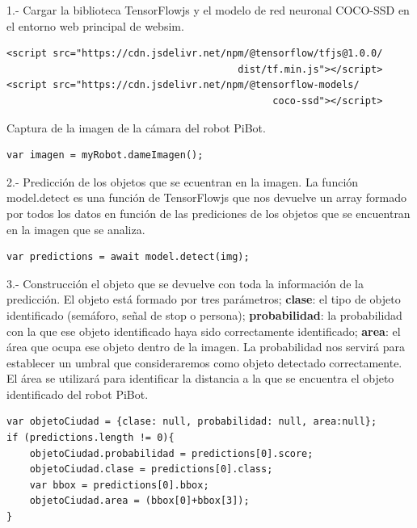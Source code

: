 \documentclass{report}
\begin{document}
1.- Cargar la biblioteca TensorFlowjs y el modelo de red neuronal COCO-SSD en el entorno web principal de websim.

\begin{lstlisting}[backgroundcolor = \color{light-gray},
				   aboveskip = 2em,
				   belowskip = 2em,
                   framexleftmargin = 1em,
                   basicstyle=\small]
<script src="https://cdn.jsdelivr.net/npm/@tensorflow/tfjs@1.0.0/
                                        dist/tf.min.js"></script>
<script src="https://cdn.jsdelivr.net/npm/@tensorflow-models/
                                              coco-ssd"></script>
\end{lstlisting}

Captura de la imagen de la cámara del robot PiBot.

\begin{lstlisting}[backgroundcolor = \color{light-gray},
				   aboveskip = 2em,
				   belowskip = 2em,
                   xleftmargin = 2cm,
                   framexleftmargin = 1em,
                   basicstyle=\small]
var imagen = myRobot.dameImagen();
\end{lstlisting}

2.- Predicción de los objetos que se ecuentran en la imagen. La función model.detect es una función de TensorFlowjs que nos devuelve un array formado por todos los datos en función de las prediciones de los objetos que se encuentran en la imagen que se analiza.

\begin{lstlisting}[backgroundcolor = \color{light-gray},
				   aboveskip = 2em,
				   belowskip = 2em,
                   xleftmargin = 2cm,
                   framexleftmargin = 1em,
                   basicstyle=\small]
var predictions = await model.detect(img);
\end{lstlisting}

3.- Construcción el objeto que se devuelve con toda la información de la predicción. El objeto está formado por tres parámetros; \textbf{clase}: el tipo de objeto identificado (semáforo, señal de stop o persona); \textbf{probabilidad}: la probabilidad con la que ese objeto identificado haya sido correctamente identificado; \textbf{area}: el área que ocupa ese objeto dentro de la imagen. La probabilidad nos servirá para establecer un umbral que consideraremos como objeto detectado correctamente. El área se utilizará para identificar la distancia a la que se encuentra el objeto identificado del robot PiBot.


\begin{lstlisting}[backgroundcolor = \color{light-gray},
				   belowskip = 2em,
                   xleftmargin = 2cm,
                   framexleftmargin = 1em,
                   basicstyle=\small]
var objetoCiudad = {clase: null, probabilidad: null, area:null};
if (predictions.length != 0){
	objetoCiudad.probabilidad = predictions[0].score;
	objetoCiudad.clase = predictions[0].class;
	var bbox = predictions[0].bbox;
	objetoCiudad.area = (bbox[0]+bbox[3]);
}
\end{lstlisting}
\end{document}
